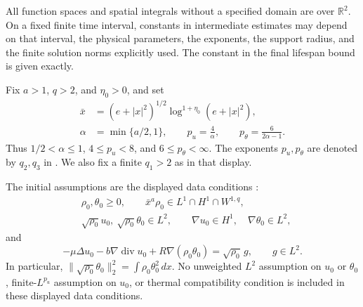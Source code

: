 \documentclass[10pt,twoside]{article}
\newcommand{\R}{\mathbb R}
\newcommand{\dd}{\,dx}
\newcommand{\Div}{\operatorname{div}}
\newcommand{\norm}[2]{\lVert#1\rVert_{#2}}
\begin{document}
All function spaces and spatial integrals without a specified domain
are over $\R^2$. On a fixed finite time interval, constants in
intermediate estimates may depend on that interval, the physical
parameters, the exponents, the support radius, and the finite solution
norms explicitly used. The constant in the final lifespan bound is
given exactly.

Fix $a>1$, $q>2$, and $\eta_0>0$, and set
\begin{equation}
 \begin{aligned}
 \bar x&=(e+|x|^2)^{1/2}\log^{1+\eta_0}(e+|x|^2),\\
 \alpha&=\min\{a/2,1\},\qquad
 p_u=\frac4\alpha,\qquad
 p_\theta=\frac6{2\alpha-1}.
 \end{aligned}\label{eq:weights}
\end{equation}
Thus $1/2<\alpha\le1$, $4\le p_u<8$, and
$6\le p_\theta<\infty$. The exponents $p_u,p_\theta$ are denoted
by $q_2,q_3$ in \cite[(1.9)]{WangV1}. We also fix a finite
$q_1>2$ as in that display.

The initial assumptions are the displayed data conditions
\cite[(1.6)--(1.7)]{WangV1}:
\begin{equation}
 \begin{aligned}
 &\rho_0,\theta_0\ge0,\qquad
       \bar x^a\rho_0\in L^1\cap H^1\cap W^{1,q},\\
 &\sqrt{\rho_0}u_0,\ \sqrt{\rho_0}\theta_0\in L^2,\qquad
       \nabla u_0\in H^1,\quad \nabla\theta_0\in L^2,
 \end{aligned}\label{eq:data}
\end{equation}
and
\begin{equation}
 -\mu\Delta u_0-b\nabla\Div u_0
       +R\nabla(\rho_0\theta_0)=\sqrt{\rho_0}\,g,
 \qquad g\in L^2.
 \label{eq:compatibility}
\end{equation}
In particular, $\norm{\sqrt{\rho_0}\theta_0}{2}^2
=\int\rho_0\theta_0^2\dd$. No unweighted $L^2$ assumption on
$u_0$ or $\theta_0$, finite-$L^{p_u}$ assumption on $u_0$, or thermal
compatibility condition is included in these displayed data conditions.
\end{document}
